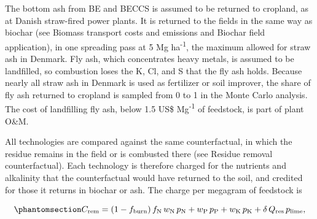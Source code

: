 \documentclass[
  letterpaper,
  twoside,
  twocolumn,
  9pt]{article}
\begin{document}
The bottom ash from BE and BECCS is assumed to be returned to cropland,
as at Danish straw-fired power plants. It is returned to the fields in
the same way as biochar (see Biomass transport costs and emissions and
Biochar field application), in one spreading pass at 5 Mg
ha\textsuperscript{-1}, the maximum allowed for straw ash in
Denmark.\citep{bioash2019} Fly ash, which concentrates heavy metals, is
assumed to be landfilled, so combustion loses the K, Cl, and S that the
fly ash holds. Because nearly all straw ash in Denmark is used as
fertilizer or soil improver,\citep{lamers2018} the share of fly ash
returned to cropland is sampled from 0 to 1 in the Monte Carlo analysis.
The cost of landfilling fly ash, below 1.5 US\$ Mg\textsuperscript{-1}
of feedstock, is part of plant O\&M.

All technologies are compared against the same counterfactual, in which
the residue remains in the field or is combusted there (see Residue
removal counterfactual). Each technology is therefore charged for the
nutrients and alkalinity that the counterfactual would have returned to
the soil, and credited for those it returns in biochar or ash. The
charge per megagram of feedstock is

\begin{equation}\phantomsection\label{eq-removal}{C_{\mathrm{rem}} = (1 - f_{\mathrm{burn}})\, f_{\mathrm{N}}\, w_{\mathrm{N}}\, p_{\mathrm{N}} + w_{\mathrm{P}}\, p_{\mathrm{P}} + w_{\mathrm{K}}\, p_{\mathrm{K}} + \delta\, Q_{\mathrm{res}}\, p_{\mathrm{lime}},}\end{equation}
\end{document}
